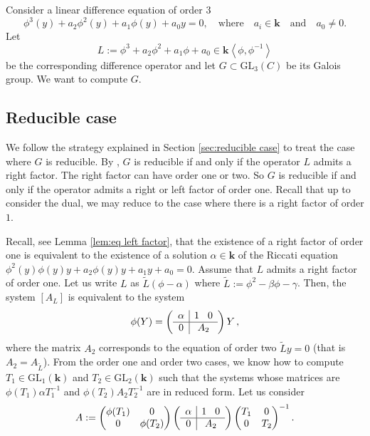 \documentclass[a4paper,11pt]{amsart}
\newcommand{\GL}{\operatorname{GL}}
\def\k{\mathbf{k}}
\def\GL{\mathrm{GL}}
\begin{document}
Consider a linear  difference equation of order $3$ 
$$  \phi^3 (y)+ a_2 \phi^2 (y)+a_1 \phi (y)+a_0 y=0, \quad \text{where}\quad  a_i\in \k\quad \text{and}\quad  a_0 \neq 0.$$
 Let 
 $$
 L :=  \phi^3 + a_2 \phi^2 +a_1 \phi +a_0\in \k\left< \phi,\phi^{-1}\right>
 $$ 
be the corresponding difference operator and let $G\subset \GL_{3}(C)$ be its Galois group.  We want to compute $G$. 
 
 \subsection{Reducible case}
 
 We follow the strategy explained in Section \ref{sec:reducible case} to treat the case where $G$ is reducible.  By \cite[Lemma~4.4]{adamczewski2021hypertranscendence}, $G$ is reducible if and only if the operator $L$ admits a right factor.  The right factor can have order one or two.  So $G$ is reducible if and only if the operator admits a right or left factor of order one.   Recall that up to consider the dual, we may reduce to the case where there is a right factor of order $1$.  \par 
Recall, see Lemma \ref{lem:eq left factor},  that the existence of a right factor of  order one is equivalent to the existence of  a solution $\alpha\in\k$ of the Riccati equation $\phi^2 (y)\phi(y)y+a_2 \phi (y)y+a_1y+a_0=0$.   
Assume that $L$ admits a right factor of order one.   Let us write $L$ as 
$\widetilde{L}(\phi -\alpha)$ where $\widetilde{L}:=\phi^2-\beta \phi-\gamma$. 
Then,  the system $[A_L]$ is equivalent to the system 
$$\phi (Y)= \left(\begin{array}{c|c}
\alpha &  1 \hspace*{0.3cm} 0  \\
\hline
0 &  A_2 
\end{array}\right)Y \, , $$
where the matrix $A_2$ corresponds to the equation of order two $\widetilde{L}y=0$ (that is $A_2 = A_{\widetilde{L}}$).  
From the order one and order two cases, we know how to compute $T_1\in \GL_1 (\k)$ and $T_2\in \GL_2 (\k)$ such that the systems whose matrices are $\phi(T_1)\alpha T_1^{-1}$ and $\phi(T_2)A_2 T_2^{-1}$ are in reduced form. Let us consider 
$$A := \begin{pmatrix}
\phi(T_1)&0 \\ 
0 &\phi(T_2)
\end{pmatrix}\left(\begin{array}{c|c}
\alpha &  1 \hspace*{0.3cm} 0  \\
\hline
0 &  A_2 
\end{array}\right)\begin{pmatrix}
T_1&0 \\ 
0 &T_2
\end{pmatrix}^{-1}.$$
\end{document}
